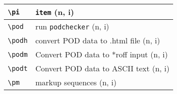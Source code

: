\documentclass[oneside,10pt,landscape,DIV17]{scrartcl}
\begin{document}
\begin{multicols}{3}
\begin{center}
\begin{tabular}[]{|p{11mm}|p{60mm}|}
\hline \verb'\pi'     & \verb'item'                     \hfill (n, i)\\
\hline \verb'\pod'    & run \verb'podchecker'           \hfill (n, i)\\
\hline \verb'\podh'   & convert POD data to .html file  \hfill (n, i)\\
\hline \verb'\podm'   & Convert POD data to *roff input \hfill (n, i)\\
\hline \verb'\podt'   & Convert POD data to ASCII text  \hfill (n, i)\\
\hline \verb'\pm'     & markup sequences                \hfill (n, i)\\
\hline
\end{tabular}\\
%
%
\end{center}%
\end{multicols}%
%
\newpage
%
%
\end{document}
